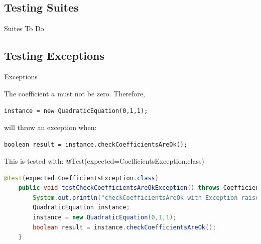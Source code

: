 \documentclass[11pt, xcolor=svgnames]{beamer}
\begin{document}

\subsection{Testing Suites}


\begin{frame}[fragile]{Suites}
  To Do
\end{frame}


\subsection{Testing Exceptions}



\begin{frame}[fragile]{Exceptions}

The coefficient $a$ must not be zero. Therefore,

\texttt{instance = new QuadraticEquation(0,1,1);}

will throw an exception when:

\texttt{boolean result = instance.checkCoefficientsAreOk();}

This is tested with:
    @Test(expected=CoefficientsException.class)

\begin{lstlisting}[language=JAVA,basicstyle=\scriptsize]
    @Test(expected=CoefficientsException.class)
    public void testCheckCoefficientsAreOkException() throws CoefficientsException {
        System.out.println("checkCoefficientsAreOk with Exception raised");
        QuadraticEquation instance;
        instance = new QuadraticEquation(0,1,1);
        boolean result = instance.checkCoefficientsAreOk();
    }
\end{lstlisting}

\end{frame}



\end{document}

